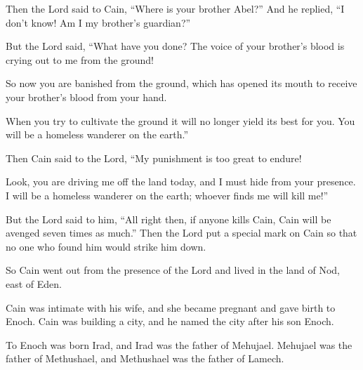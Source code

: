 \begin{scripture}
 Then the Lord said to Cain, ``Where is your brother Abel?'' And he replied, ``I don't know! Am I my brother's guardian?''
 But the Lord said, ``What have you done? The voice of your brother's blood is crying out to me from the ground!
 So now you are banished from the ground, which has opened its mouth to receive your brother's blood from your hand.
 When you try to cultivate the ground it will no longer yield its best for you. You will be a homeless wanderer on the earth.''
\everypar{}

 Then Cain said to the Lord, ``My punishment is too great to endure!
 Look, you are driving me off the land today, and I must hide from your presence. I will be a homeless wanderer on the earth; whoever finds me will kill me!''
 But the Lord said to him, ``All right then, if anyone kills Cain, Cain will be avenged seven times as much.'' Then the Lord put a special mark on Cain so that no one who found him would strike him down.
 So Cain went out from the presence of the Lord and lived in the land of Nod, east of Eden.
\everypar{}

 Cain was intimate with his wife, and she became pregnant and gave birth to Enoch. Cain was building a city, and he named the city after his son Enoch.
 To Enoch was born Irad, and Irad was the father of Mehujael. Mehujael was the father of Methushael, and Methushael was the father of Lamech.
\everypar{}


\end{scripture}

